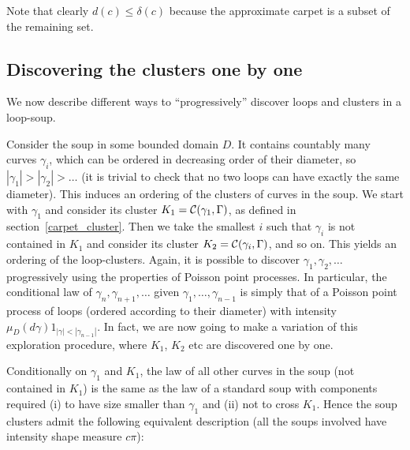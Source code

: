 \documentclass[11pt]{article}
\newcommand{\clus}[2]{{\cal C} ({#1},{#2})}
\begin{document}
Note that clearly $d(c) \le \delta (c)$ because the approximate carpet is a subset of the remaining set. 

\subsection {Discovering the clusters one by one}

We now describe different ways to ``progressively'' discover loops and clusters 
in a loop-soup.

Consider the soup in some bounded domain $D$. It contains
countably many curves $\gamma_i$, which can be ordered in decreasing order
of their diameter, so $|\gamma_1| > |\gamma_2| > \ldots$ (it is trivial to check that no two loops can have exactly the same diameter).
This induces
an ordering of the clusters of curves in the soup. We start with
$\gamma_1$ and consider its cluster $K_1 = \clus{\gamma_1}{\Gamma}$,
as defined in section~\ref{carpet_cluster}.
Then we take the smallest $i$ such that $\gamma_i$ is not contained in
$K_1$ and consider its cluster $K_2 = \clus{\gamma_i}{\Gamma}$, and so on. 
This yields an ordering of the loop-clusters. 
Again, it is possible to discover $\gamma_1, \gamma_2, \ldots$ 
progressively using the properties of Poisson point processes.
In particular, the conditional law of 
$\gamma_n, \gamma_{n+1}, \ldots $ given $\gamma_1, \ldots , \gamma_{n-1}$ 
is simply that of a Poisson point process of loops 
(ordered according to their diameter) with intensity 
$\mu_D( d \gamma) 1_{ |\gamma |< |\gamma_{n-1}| }$. 
In fact, we are now going to make a variation of this exploration procedure, 
where $K_1$, $K_2$ etc are discovered one by one.

\medbreak

Conditionally on $\gamma_1$ and $K_1$, the law of all other curves in the soup
(not contained in $K_1$) is the same as the law of a standard soup with
components required (i) to have size smaller
than $\gamma_1$ and (ii) not to cross $K_1$.
Hence the soup clusters admit the following equivalent
description (all the soups involved have intensity shape measure $c\pi$):
\end{document}
